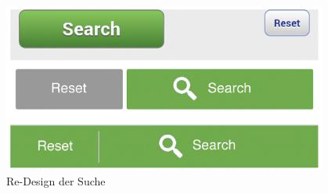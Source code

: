 \begin{figure}[h]
 \centering
 \includegraphics[height=0.08\textheight]{img/search.png}
 \caption{Re-Design der Suche}
 \label{fig:search}
\end{figure}